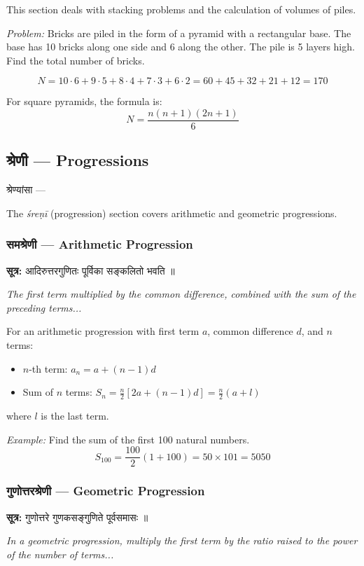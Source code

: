 \documentclass[10pt,a4paper]{article}
\newenvironment{sanskritverse}{%
  \begin{center}%
  \begin{minipage}{0.94\textwidth}%
  \centering\devanagarifont\small%
}{%
  \end{minipage}%
  \end{center}%
  \vspace{0.1em}%
}
\newcommand{\sutratxt}[2]{%
  \begin{center}%
  \colorbox{sanskritbg}{%
    \begin{minipage}{0.93\textwidth}%
    \centering\small\vspace{3pt}%
    {\devanagarifont\textbf{सूत्र:} #1}\par\vspace{2pt}%
    \textit{#2}\vspace{3pt}%
    \end{minipage}%
  }%
  \end{center}%
  \vspace{0.1em}%
}
\begin{document}
This section deals with stacking problems and the calculation of volumes of piles.

\textit{Problem:} Bricks are piled in the form of a pyramid with a rectangular base. The base has 10 bricks along one side and 6 along the other. The pile is 5 layers high. Find the total number of bricks.

\[
N = 10 \cdot 6 + 9 \cdot 5 + 8 \cdot 4 + 7 \cdot 3 + 6 \cdot 2 = 60+45+32+21+12 = 170
\]

For square pyramids, the formula is:
\[
N = \frac{n(n+1)(2n+1)}{6}
\]

\subsection{श्रेणी — Progressions}

\begin{sanskritverse}
श्रेण्यांसा ---
\end{sanskritverse}

The \textit{śreṇī} (progression) section covers arithmetic and geometric progressions.

\subsubsection{समश्रेणी — Arithmetic Progression}

\sutratxt{आदिरुत्तरगुणितः पूर्विका सङ्कलितो भवति ॥}{The first term multiplied by the common difference, combined with the sum of the preceding terms...}

For an arithmetic progression with first term $a$, common difference $d$, and $n$ terms:

\begin{itemize}[itemsep=0pt]
\item $n$-th term: $a_n = a + (n-1)d$
\item Sum of $n$ terms: $S_n = \frac{n}{2}[2a + (n-1)d] = \frac{n}{2}(a + l)$
\end{itemize}

where $l$ is the last term.

\textit{Example:} Find the sum of the first 100 natural numbers.
\[
S_{100} = \frac{100}{2}(1 + 100) = 50 \times 101 = 5050
\]

\subsubsection{गुणोत्तरश्रेणी — Geometric Progression}

\sutratxt{गुणोत्तरे गुणकसङ्गुणिते पूर्वसमासः ॥}{In a geometric progression, multiply the first term by the ratio raised to the power of the number of terms...}
\end{document}
